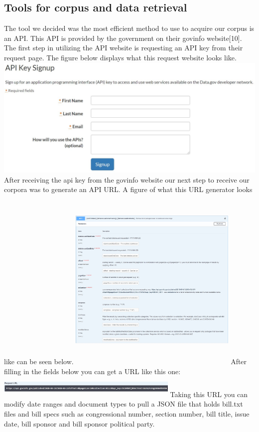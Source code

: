 \documentclass[11pt,a4paper]{article}
\begin{document}
\subsection{Tools for corpus and data retrieval}
The tool we decided was the most efficient method to use to acquire our corpus is an API. This API is provided by the government on their govinfo website[10]. The first step in utilizing the API website is requesting an API key from their request page. The figure below displays what this request website looks like.
\newline\newline
\includegraphics[scale=0.32]{figs/Apikey.jpg}
\newline\newline
After receiving the api key from the govinfo website our next step to receive our corpora was to generate an API URL. A figure of what this URL generator looks like can be seen below.
\newline\newline
\includegraphics[width=8.1cm, height=9cm]{figs/Urlgeneration.JPG}
\newline\newline
After filling in the fields below you can get a URL like this one:
\newline
\newline
\noindent
\includegraphics[width=8.7cm, height=1.1cm]{figs/URL.JPG}
\newline
\newline
\noindent
Taking this URL you can modify date ranges and document types to pull a JSON file that holds bill.txt files and bill specs such as congressional number, section number, bill title, issue date, bill sponsor and bill sponsor political party. 
\end{document}
